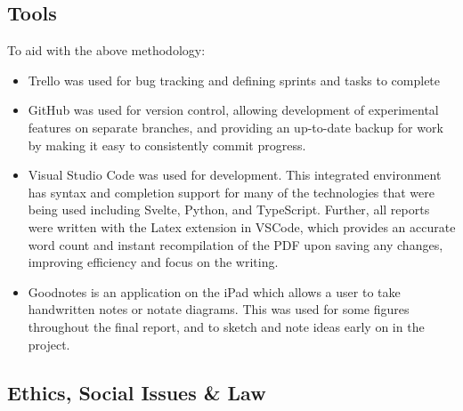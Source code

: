 \documentclass[12pt,a4paper]{article}
\begin{document}
\subsection{Tools}
To aid with the above methodology:
\begin{itemize}
    \item Trello was used for bug tracking and defining sprints and tasks to complete
    \item GitHub was used for version control, allowing development of experimental features on separate branches, and providing an up-to-date backup for work by making it easy to consistently commit progress.
    \item Visual Studio Code was used for development. This integrated environment has syntax and completion support for many of the technologies that were being used including Svelte, Python, and TypeScript. Further, all reports were written with the Latex extension in VSCode, which provides an accurate word count and instant recompilation of the PDF upon saving any changes, improving efficiency and focus on the writing.
    \item Goodnotes is an application on the iPad which allows a user to take handwritten notes or notate diagrams. This was used for some figures throughout the final report, and to sketch and note ideas early on in the project.
\end{itemize}
\subsection{Ethics, Social Issues \& Law}
\end{document}
